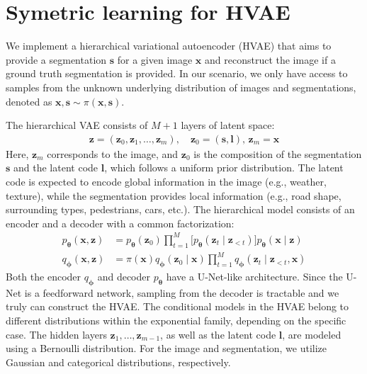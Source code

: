 \section{Symetric learning for HVAE}
We implement a hierarchical variational autoencoder (HVAE) that aims to provide a segmentation 
$\mathbf{s}$ for a given image $\mathbf{x}$ and reconstruct the image if a ground truth segmentation is provided. 
In our scenario, we only have access to samples from the unknown underlying distribution of images and
segmentations, denoted as $\mathbf{x}, \mathbf{s} \sim \pi(\mathbf{x},\mathbf{s})$.

The hierarchical VAE consists of $M+1$ layers of latent space:
\begin{align*}
\mathbf{z} = (\mathbf{z}_0, \mathbf{z}_1, \dots, \mathbf{z}_m), \quad \mathbf{z}_0 = (\mathbf{s}, \mathbf{l}),\, \mathbf{z}_m = \mathbf{x}
\end{align*}
Here, $\mathbf{z}_m$ corresponds to the image, and $\mathbf{z}_0$ is the composition of the segmentation $\mathbf{s}$ and 
the latent code $\mathbf{l}$, which follows a uniform prior distribution. The latent code is expected to encode global
information in the image (e.g., weather, texture), while the segmentation provides local information (e.g., road shape,
surrounding types, pedestrians, cars, etc.). The hierarchical model consists of an encoder and
 a decoder with a common factorization:
\begin{align*}
    p_{\boldsymbol{\theta}}(\boldsymbol{x},\boldsymbol{z})&=p_{\boldsymbol{\theta}}(\boldsymbol{z}_{0}) \prod_{t=1}^{M}\bigl[p_{\boldsymbol{\theta}}(\boldsymbol{z}_{t}\mid\boldsymbol{z}_{<t}) \bigr]  p_{\boldsymbol{\theta}}(\boldsymbol{x}\mid\boldsymbol{z})  \\
    q_{\boldsymbol{\phi}}(\boldsymbol{x},\boldsymbol{z}) &=\pi(\boldsymbol{x})q_{\boldsymbol{\phi}}(\boldsymbol{z}_{0}\mid\boldsymbol{x}) \prod_{t=1}^{M}  q_{\boldsymbol{\phi}}(\boldsymbol{z}_{t}\mid\boldsymbol{z}_{<t},\boldsymbol{x}) 
\end{align*}
Both the encoder $q_{\boldsymbol{\phi}}$ and decoder $p_{\boldsymbol{\theta}}$ have a U-Net-like architecture. Since
 the U-Net is a feedforward network, sampling from the decoder is tractable and we truly can construct the HVAE. 
 The conditional models in the HVAE belong to different distributions within the exponential family, depending on the 
 specific case. The hidden layers $\mathbf{z}_1, \dots, \mathbf{z}_{m-1}$, as well as the latent 
 code $\mathbf{l}$, are modeled using a Bernoulli distribution. For the image and segmentation, we utilize Gaussian
 and categorical distributions, respectively.
 

